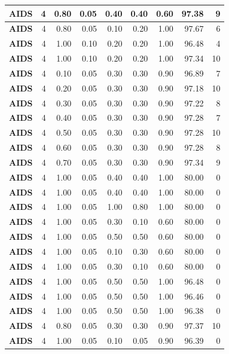 \begin{longtable}{|l||r|r|r|r|r|r||r|r|}
		\textbf{AIDS} & 4 & 0.80 & 0.05 & 0.40 & 0.40 & 0.60 & 97.38 & 9 \\ \hline
		\textbf{AIDS} & 4 & 0.80 & 0.05 & 0.10 & 0.20 & 1.00 & 97.67 & 6 \\ \hline
		\textbf{AIDS} & 4 & 1.00 & 0.10 & 0.20 & 0.20 & 1.00 & 96.48 & 4 \\ \hline
		\textbf{AIDS} & 4 & 1.00 & 0.10 & 0.20 & 0.20 & 1.00 & 97.34 & 10 \\ \hline
		\textbf{AIDS} & 4 & 0.10 & 0.05 & 0.30 & 0.30 & 0.90 & 96.89 & 7 \\ \hline
		\textbf{AIDS} & 4 & 0.20 & 0.05 & 0.30 & 0.30 & 0.90 & 97.18 & 10 \\ \hline
		\textbf{AIDS} & 4 & 0.30 & 0.05 & 0.30 & 0.30 & 0.90 & 97.22 & 8 \\ \hline
		\textbf{AIDS} & 4 & 0.40 & 0.05 & 0.30 & 0.30 & 0.90 & 97.28 & 7 \\ \hline
		\textbf{AIDS} & 4 & 0.50 & 0.05 & 0.30 & 0.30 & 0.90 & 97.28 & 10 \\ \hline
		\textbf{AIDS} & 4 & 0.60 & 0.05 & 0.30 & 0.30 & 0.90 & 97.28 & 8 \\ \hline
		\textbf{AIDS} & 4 & 0.70 & 0.05 & 0.30 & 0.30 & 0.90 & 97.34 & 9 \\ \hline
		\textbf{AIDS} & 4 & 1.00 & 0.05 & 0.40 & 0.40 & 1.00 & 80.00 & 0 \\ \hline
		\textbf{AIDS} & 4 & 1.00 & 0.05 & 0.40 & 0.40 & 1.00 & 80.00 & 0 \\ \hline
		\textbf{AIDS} & 4 & 1.00 & 0.05 & 1.00 & 0.80 & 1.00 & 80.00 & 0 \\ \hline
		\textbf{AIDS} & 4 & 1.00 & 0.05 & 0.30 & 0.10 & 0.60 & 80.00 & 0 \\ \hline
		\textbf{AIDS} & 4 & 1.00 & 0.05 & 0.50 & 0.50 & 0.60 & 80.00 & 0 \\ \hline
		\textbf{AIDS} & 4 & 1.00 & 0.05 & 0.10 & 0.30 & 0.60 & 80.00 & 0 \\ \hline
		\textbf{AIDS} & 4 & 1.00 & 0.05 & 0.30 & 0.10 & 0.60 & 80.00 & 0 \\ \hline
		\textbf{AIDS} & 4 & 1.00 & 0.05 & 0.50 & 0.50 & 1.00 & 96.48 & 0 \\ \hline
		\textbf{AIDS} & 4 & 1.00 & 0.05 & 0.50 & 0.50 & 1.00 & 96.46 & 0 \\ \hline
		\textbf{AIDS} & 4 & 1.00 & 0.05 & 0.50 & 0.50 & 1.00 & 96.38 & 0 \\ \hline
		\textbf{AIDS} & 4 & 0.80 & 0.05 & 0.30 & 0.30 & 0.90 & 97.37 & 10 \\ \hline
		\textbf{AIDS} & 4 & 1.00 & 0.05 & 0.10 & 0.05 & 0.90 & 96.39 & 0 \\ \hline

\end{longtable}
